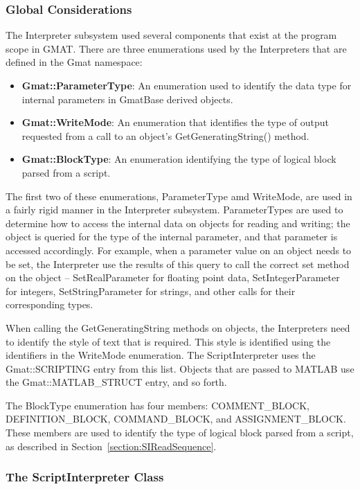 \subsubsection{Global Considerations}

The Interpreter subsystem used several components that exist at the program scope in GMAT.  There
are three enumerations used by the Interpreters that are defined in the Gmat namespace:

\begin{itemize}
\item \textbf{Gmat::ParameterType}: An enumeration used to identify the data type for internal
parameters in GmatBase derived objects.
\item \textbf{Gmat::WriteMode}: An enumeration that identifies the type of output requested from a
call to an object's GetGeneratingString() method.
\item \textbf{Gmat::BlockType}: An enumeration identifying the type of logical block parsed from a
script.
\end{itemize}

The first two of these enumerations, ParameterType amd WriteMode, are used in a fairly rigid manner
in the Interpreter subsystem.  ParameterTypes are used to determine how to access the internal data
on objects for reading and writing; the object is queried for the type of the internal parameter,
and that parameter is accessed accordingly.  For example, when a parameter value on an object
needs to be set, the Interpreter use the results of this query to call the correct set method on
the object -- SetRealParameter for floating point data, SetIntegerParameter for integers,
SetStringParameter for strings, and other calls for their corresponding types.

When calling the GetGeneratingString methods on objects, the Interpreters need to identify the style
of text that is required.  This style is identified using the identifiers in the WriteMode
enumeration.  The ScriptInterpreter uses the Gmat::SCRIPTING entry from this list.  Objects that
are passed to MATLAB use the Gmat::MATLAB\_STRUCT entry, and so forth.

The BlockType enumeration has four members: COMMENT\_BLOCK, DEFINITION\_BLOCK, COMMAND\_BLOCK, and
ASSIGNMENT\_BLOCK.  These members are used to identify the type of logical block parsed from a
script, as described in Section~\ref{section:SIReadSequence}.

\subsubsection{The ScriptInterpreter Class}

